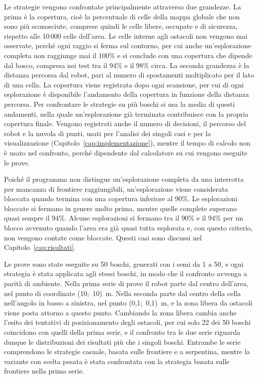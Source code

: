 Le strategie vengono confrontate principalmente attraverso due grandezze. La prima è la copertura, cioè la percentuale di celle della mappa globale che non sono più sconosciute, comprese quindi le celle libere, occupate e di sicurezza, rispetto alle 10\,000 celle dell'area. Le celle interne agli ostacoli non vengono mai osservate, perché ogni raggio si ferma sul contorno, per cui anche un'esplorazione completa non raggiunge mai il 100\% e si conclude con una copertura che dipende dal bosco, compresa nei test tra il 94\% e il 98\% circa. La seconda grandezza è la distanza percorsa dal robot, pari al numero di spostamenti moltiplicato per il lato di una cella. La copertura viene registrata dopo ogni scansione, per cui di ogni esplorazione è disponibile l'andamento della copertura in funzione della distanza percorsa. Per confrontare le strategie su più boschi si usa la media di questi andamenti, nella quale un'esplorazione già terminata contribuisce con la propria copertura finale. Vengono registrati anche il numero di decisioni, il percorso del robot e la nuvola di punti, usati per l'analisi dei singoli casi e per la visualizzazione (Capitolo~\ref{cap:implementazione}), mentre il tempo di calcolo non è usato nel confronto, perché dipendente dal calcolatore su cui vengono eseguite le prove.

Poiché il programma non distingue un'esplorazione completa da una interrotta per mancanza di frontiere raggiungibili, un'esplorazione viene considerata bloccata quando termina con una copertura inferiore al 90\%. Le esplorazioni bloccate si fermano in genere molto prima, mentre quelle complete superano quasi sempre il 94\%. Alcune esplorazioni si fermano tra il 90\% e il 94\% per un blocco avvenuto quando l'area era già quasi tutta esplorata e, con questo criterio, non vengono contate come bloccate. Questi casi sono discussi nel Capitolo~\ref{cap:risultati}.

Le prove sono state eseguite su 50 boschi, generati con i semi da 1 a 50, e ogni strategia è stata applicata agli stessi boschi, in modo che il confronto avvenga a parità di ambiente. Nella prima serie di prove il robot parte dal centro dell'area, nel punto di coordinate (10;~10)~m. Nella seconda parte dal centro della cella nell'angolo in basso a sinistra, nel punto (0,1;~0,1)~m, e la zona libera da ostacoli viene posta attorno a questo punto. Cambiando la zona libera cambia anche l'esito dei tentativi di posizionamento degli ostacoli, per cui solo 22 dei 50 boschi coincidono con quelli della prima serie, e il confronto tra le due serie riguarda dunque le distribuzioni dei risultati più che i singoli boschi. Entrambe le serie comprendono le strategie casuale, basata sulle frontiere e a serpentina, mentre la variante con scelta pesata è stata confrontata con la strategia basata sulle frontiere nella prima serie.

